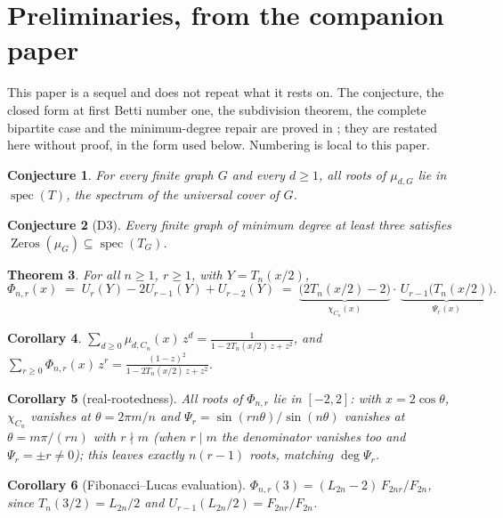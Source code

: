 \documentclass[11pt]{article}
\newtheorem{theorem}{Theorem}
\newtheorem{corollary}[theorem]{Corollary}
\newtheorem{conjecture}[theorem]{Conjecture}
\theoremstyle{remark}
\begin{document}
\section{Preliminaries, from the companion paper}\label{sec:prelim}

This paper is a sequel and does not repeat what it rests on. The conjecture, the closed form at
first Betti number one, the subdivision theorem, the complete bipartite case and the
minimum-degree repair are proved in \cite{PartI}; they are restated here without proof, in the
form used below. Numbering is local to this paper.

\begin{conjecture}\label{conj:gap}
For every finite graph $G$ and every $d\ge1$, all roots of $\mu_{d,G}$ lie in
$\operatorname{spec}(T)$, the spectrum of the universal cover of $G$.
\end{conjecture}

\begin{conjecture}[D3]\label{conj:mindeg3}
Every finite graph of minimum degree at least three satisfies
$\operatorname{Zeros}(\mu_G)\subseteq\operatorname{spec}(T_G)$.
\end{conjecture}

\begin{theorem}\label{thm:main}
For all $n\ge 1$, $r\ge 1$, with $Y=T_n(x/2)$,
\[
\Phi_{n,r}(x)\;=\;U_r(Y)-2U_{r-1}(Y)+U_{r-2}(Y)
\;=\;\underbrace{\bigl(2T_n(x/2)-2\bigr)}_{\chi_{C_n}(x)}\cdot\,
\underbrace{U_{r-1}\bigl(T_n(x/2)\bigr)}_{\Psi_r(x)} .
\]
\end{theorem}

\begin{corollary}\label{cor:gf}
$\displaystyle\sum_{d\ge 0}\mu_{d,C_n}(x)\,z^d=\frac{1}{1-2T_n(x/2)\,z+z^2}$,
\quad and \quad
$\displaystyle\sum_{r\ge 0}\Phi_{n,r}(x)\,z^r=\frac{(1-z)^2}{1-2T_n(x/2)\,z+z^2}$.
\end{corollary}

\begin{corollary}[real-rootedness]\label{cor:roots}
All roots of $\Phi_{n,r}$ lie in $[-2,2]$: with $x=2\cos\theta$,
$\chi_{C_n}$ vanishes at $\theta=2\pi m/n$ and
$\Psi_r=\sin(rn\theta)/\sin(n\theta)$ vanishes at $\theta=m\pi/(rn)$ with $r\nmid m$
(when $r\mid m$ the denominator vanishes too and $\Psi_r=\pm r\neq0$); this leaves
exactly $n(r-1)$ roots, matching $\deg\Psi_r$.
\end{corollary}

\begin{corollary}[Fibonacci--Lucas evaluation]\label{cor:fib}
$\Phi_{n,r}(3)=(L_{2n}-2)\,F_{2nr}/F_{2n}$, since $T_n(3/2)=L_{2n}/2$ and
$U_{r-1}(L_{2n}/2)=F_{2nr}/F_{2n}$.
\end{corollary}
\end{document}
